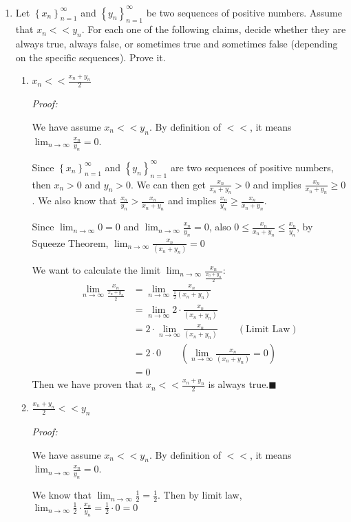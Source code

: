 \documentclass[12pt]{exam}
\newcommand {\DS} [1] {${\displaystyle #1}$}
\begin{document}
\begin{enumerate}
\newpage

\item Let \DS{\left\{x_n\right\}_{n=1}^{\infty}} and \DS{\left\{y_n\right\}_{n=1}^{\infty}} be two sequences of positive numbers.  Assume that \DS{x_n << y_n}. 
	For each one of the following claims, decide whether they are always true, always false, or sometimes true and sometimes false (depending on the specific sequences).  Prove it.
	\begin{enumerate}
		\item \DS{x_n << \frac{x_n+y_n}{2}}
		
		\emph{Proof:}
		
		We have assume $x_n << y_n$. By definition of $<<$, it means $\lim_{n\to\infty}\frac{x_n}{y_n}=0$.
		
		Since \DS{\left\{x_n\right\}_{n=1}^{\infty}} and \DS{\left\{y_n\right\}_{n=1}^{\infty}} are two sequences of positive numbers, then $x_n>0$ and $y_n>0$. We can then get $\frac{x_n}{x_n+y_n}>0$ and implies $\frac{x_n}{x_n+y_n}\geq0$. We also know that $\frac{x_n}{y_n}>\frac{x_n}{x_n+y_n}$ and implies $\frac{x_n}{y_n}\geq\frac{x_n}{x_n+y_n}$.
		
		Since $\lim_{n\to\infty}0=0$ and $\lim_{n\to\infty}\frac{x_n}{y_n}=0$, also $0\leq\frac{x_n}{x_n+y_n}\leq\frac{x_n}{y_n}$, by Squeeze Theorem, $\lim_{n\to\infty}\frac{x_n}{(x_n+y_n)}=0$
		
		We want to calculate the limit $\lim_{n\to\infty}\frac{x_n}{\frac{x_n+y_n}{2}}$:
		\begin{align*}
		    \lim_{n\to\infty}\frac{x_n}{\frac{x_n+y_n}{2}}&=\lim_{n\to\infty}\frac{x_n}{\frac{1}{2}(x_n+y_n)}\\
		    &=\lim_{n\to\infty}2\cdot\frac{x_n}{(x_n+y_n)}\\
		    &=2\cdot\lim_{n\to\infty}\frac{x_n}{(x_n+y_n)}\qquad(\mbox{Limit Law})\\
		    &=2\cdot0\qquad(\lim_{n\to\infty}\frac{x_n}{(x_n+y_n)}=0)\\
		    &=0
		\end{align*}
		Then we have proven that \DS{x_n << \frac{x_n+y_n}{2}} is always true.\qquad$\blacksquare$
		\newpage
		
		\item \DS{\frac{x_n+y_n}{2} << y_n}
		
		\emph{Proof:}
		
		We have assume $x_n << y_n$. By definition of $<<$, it means $\lim_{n\to\infty}\frac{x_n}{y_n}=0$.
		
		We know that $\lim_{n\to\infty}\frac{1}{2}=\frac{1}{2}$. Then by limit law, $\lim_{n\to\infty}\frac{1}{2}\cdot\frac{x_n}{y_n}=\frac{1}{2}\cdot0=0$
		

\end{enumerate}
\end{enumerate}
\end{document}
